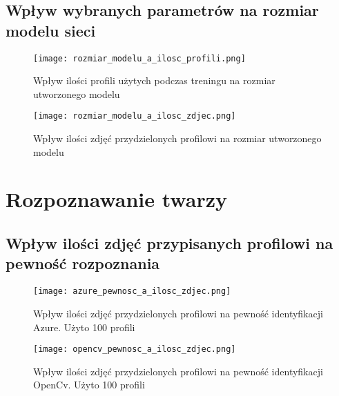 \subsection{Wpływ wybranych parametrów na rozmiar modelu sieci}
\begin{figure}[H]
	\centering
	\texttt{[image: rozmiar\_modelu\_a\_ilosc\_profili.png]}
	\caption{Wpływ ilości profili użytych podczas treningu na rozmiar utworzonego modelu}
	\label{fig:rozmiar_profile}
\end{figure}

\begin{figure}[H]
	\centering
	\texttt{[image: rozmiar\_modelu\_a\_ilosc\_zdjec.png]}
	\caption{Wpływ ilości zdjęć przydzielonych profilowi na rozmiar utworzonego modelu}
	\label{fig:rozmiar_zdjecia}
\end{figure}

\section{Rozpoznawanie twarzy} \label{b:rozpoznawanie}
\subsection{Wpływ ilości zdjęć przypisanych profilowi na pewność rozpoznania}
\begin{figure}[H]
	\centering
	\texttt{[image: azure\_pewnosc\_a\_ilosc\_zdjec.png]}
	\caption{Wpływ ilości zdjęć przydzielonych profilowi na pewność identyfikacji Azure. Użyto 100 profili}
	\label{fig:azure_zdjecia}
\end{figure}
\begin{figure}[H]
	\centering
	\texttt{[image: opencv\_pewnosc\_a\_ilosc\_zdjec.png]}
	\caption{Wpływ ilości zdjęć przydzielonych profilowi na pewność identyfikacji OpenCv. Użyto 100 profili}
	\label{fig:opencv_zdjecia}
\end{figure}

